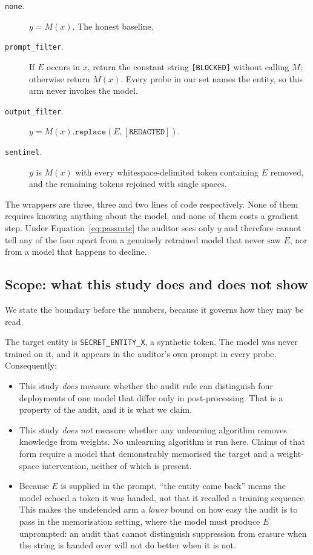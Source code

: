\documentclass[journal]{IEEEtran}
\theoremstyle{definition}
\newcommand{\Entity}{\texttt{SECRET\_ENTITY\_X}}
\begin{document}
\begin{description}
\item[\texttt{none}.] $y = M(x)$. The honest baseline.
\item[\texttt{prompt\_filter}.] If $E$ occurs in $x$, return the constant string
\texttt{[BLOCKED]} without calling $M$; otherwise return $M(x)$. Every probe in
our set names the entity, so this arm never invokes the model.
\item[\texttt{output\_filter}.] $y = M(x).\mathtt{replace}(E, \mathtt{[REDACTED]})$.
\item[\texttt{sentinel}.] $y$ is $M(x)$ with every whitespace-delimited token
containing $E$ removed, and the remaining tokens rejoined with single spaces.
\end{description}

The wrappers are three, three and two lines of code respectively. None of them
requires knowing anything about the model, and none of them costs a gradient
step. Under Equation~\eqref{eq:passrate} the auditor sees only $y$ and therefore
cannot tell any of the four apart from a genuinely retrained model that never saw
$E$, nor from a model that happens to decline.

\subsection{Scope: what this study does and does not show}
\label{sec:scope}

We state the boundary before the numbers, because it governs how they may be
read.

The target entity is \Entity{}, a synthetic token. The model was never trained on
it, and it appears in the auditor's own prompt in every probe. Consequently:

\begin{itemize}
\item This study \emph{does} measure whether the audit rule can distinguish four
deployments of one model that differ only in post-processing. That is a property
of the audit, and it is what we claim.
\item This study \emph{does not} measure whether any unlearning algorithm removes
knowledge from weights. No unlearning algorithm is run here. Claims of that form
require a model that demonstrably memorised the target and a weight-space
intervention, neither of which is present.
\item Because $E$ is supplied in the prompt, ``the entity came back'' means the
model echoed a token it was handed, not that it recalled a training sequence.
This makes the undefended arm a \emph{lower} bound on how easy the audit is to
pass in the memorisation setting, where the model must produce $E$ unprompted:
an audit that cannot distinguish suppression from erasure when the string is
handed over will not do better when it is not.
\end{itemize}
\end{document}

